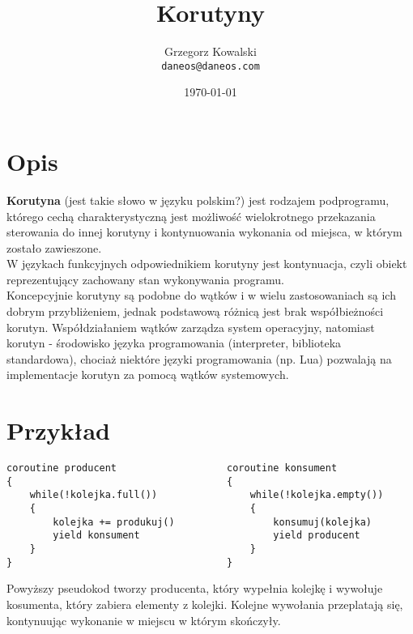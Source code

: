 \documentclass[12pt,a4paper]{article}
\begin{document}
\title{Korutyny}
\author{Grzegorz Kowalski\\\texttt{daneos@daneos.com}}
\date{\today}
\maketitle

\section{Opis}
\textbf{Korutyna} (jest takie słowo w języku polskim?) jest rodzajem podprogramu, którego cechą charakterystyczną jest możliwość wielokrotnego przekazania sterowania do innej korutyny i kontynuowania wykonania od miejsca, w którym zostało zawieszone.\\
W językach funkcyjnych odpowiednikiem korutyny jest kontynuacja, czyli obiekt reprezentujący zachowany stan wykonywania programu.\\
Koncepcyjnie korutyny są podobne do wątków i w wielu zastosowaniach są ich dobrym przybliżeniem, jednak podstawową różnicą jest brak współbieżności korutyn.
Współdziałaniem wątków zarządza system operacyjny, natomiast korutyn - środowisko języka programowania (interpreter, biblioteka standardowa), chociaż niektóre języki programowania (np. Lua) pozwalają na implementacje korutyn za pomocą wątków systemowych.

\section{Przykład}
\begin{verbatim}
coroutine producent                   coroutine konsument
{                                     {
    while(!kolejka.full())                while(!kolejka.empty())
    {                                     {
        kolejka += produkuj()                 konsumuj(kolejka)
        yield konsument                       yield producent
    }                                     }
}                                     }
\end{verbatim}
Powyższy pseudokod tworzy producenta, który wypełnia kolejkę i wywołuje kosumenta, który zabiera elementy z kolejki. Kolejne wywołania przeplatają się, kontynuując wykonanie w miejscu w którym skończyły.
\end{document}
